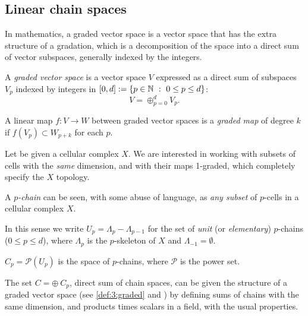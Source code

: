 \subsection{Linear chain spaces}\label{sect:3-3-1}

In mathematics, a graded vector space is a vector space that has the extra structure of a gradation, which is a decomposition of the space into a direct sum of vector subspaces, generally indexed by the integers.

\begin{definition}\label{def:3:graded}
A \emph{graded vector space} is a vector space $V$ expressed as a direct sum  of
subspaces $V_p$ indexed by integers in $[0,d] := \{p\in\N \ :\ 0\leq p\leq d\}$:
\begin{equation} 
V = \oplus_{p = 0}^d V_p.
\end{equation} 
\end{definition}

\begin{definition}\label{def:graded}
A linear map $f:V\to W$ between graded vector spaces is a \emph{graded
map} of degree $k\ $ if $f(V_p) \subset W_{p+k}$ for each $p$.
\end{definition}

Let be given a cellular complex $X$. We are interested in working with subsets of cells with the \emph{same} dimension, and with their maps 1-graded, which completely specify the $X$ topology.

\begin{definition}[$p$-chain]
A \emph{$p$-chain} can be seen, with some abuse of language, as \emph{any subset} of $p$-cells in a cellular complex $X$. 
\end{definition}


\begin{definition}
In this sense we write $U_p = \Lambda_p - \Lambda_{p-1}$ for the set of \emph{unit} (or \emph{elementary}) $p$-chains ($0\leq p\leq d$), where $\Lambda_p$ is the $p$-skeleton of $X$ and $\Lambda_{-1} = \emptyset$.
\end{definition}

\begin{definition}
$C_p = \mathcal{P}(U_p)$ is the space of $p$-chains, where $\mathcal{P}$ is the power set.
\end{definition}

The set $C=\oplus\ C_p$, direct sum of chain spaces, can be given the structure of a graded vector space (see \ref{def:3:graded} and \cite{Arnold:2018}) by
defining sums of chains with the same dimension, and products times scalars in a
field, with the usual properties.


